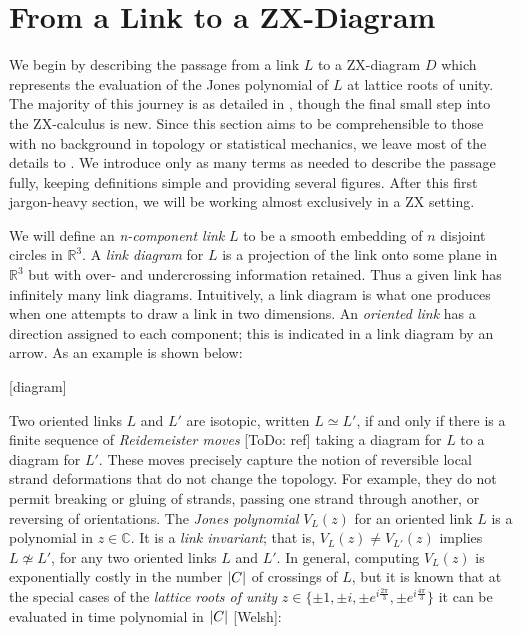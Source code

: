 \section{From a Link to a ZX-Diagram}\label{sec:passage}

We begin by describing the passage from a link $L$ to a ZX-diagram $D$ which represents the evaluation of the Jones polynomial of $L$ at lattice roots of unity. The majority of this journey is as detailed in \citep{jones_tensors}, though the final small step into the ZX-calculus is new. Since this section aims to be comprehensible to those with no background in topology or statistical mechanics, we leave most of the details to \citep{jones_tensors}. We introduce only as many terms as needed to describe the passage fully, keeping definitions simple and providing several figures. After this first jargon-heavy section, we will be working almost exclusively in a ZX setting.\newline

We will define an \textit{n-component link} $L$ to be a smooth embedding of $n$ disjoint circles in $\mathbb{R}^3$. A \textit{link diagram} for $L$ is a projection of the link onto some plane in $\mathbb{R}^3$ but with over- and undercrossing information retained. Thus a given link has infinitely many link diagrams. Intuitively, a link diagram is what one produces when one attempts to draw a link in two dimensions. An \textit{oriented link} has a direction assigned to each component; this is indicated in a link diagram by an arrow. As an example is shown below:\newline

[diagram]\newline

Two oriented links $L$ and $L'$ are isotopic, written $L \simeq L'$, if and only if there is a finite sequence of \textit{Reidemeister moves} [ToDo: ref] taking a diagram for $L$ to a diagram for $L'$. These moves precisely capture the notion of reversible local strand deformations that do not change the topology. For example, they do not permit breaking or gluing of strands, passing one strand through another, or reversing of orientations. The \textit{Jones polynomial} $V_L(z)$ for an oriented link $L$ is a polynomial in $z \in \mathbb{C}$. It is a \textit{link invariant}; that is, $V_L(z) \neq V_{L'}(z)$ implies $L \not\simeq L'$, for any two oriented links $L$ and $L'$. In general, computing $V_L(z)$ is exponentially costly in the number $\lvert C \rvert$ of crossings of $L$, but it is known that at the special cases of the \textit{lattice roots of unity} $z \in \{\pm 1, \pm i, \pm e^{i\frac{2\pi}{3}}, \pm e^{i\frac{4\pi}{3}}\}$ it can be evaluated in time polynomial in $\lvert C \rvert$ [Welsh]:\newline

